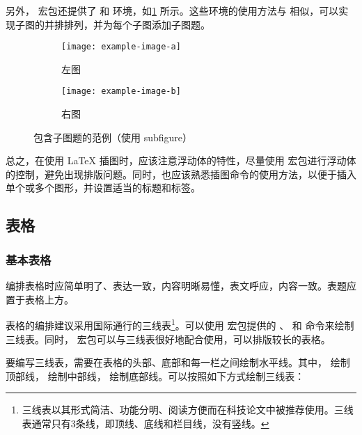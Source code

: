 另外， 宏包还提供了  和  环境，如\cref{fig:subfigure} 所示。这些环境的使用方法与  相似，可以实现子图的并排排列，并为每个子图添加子图题。

\begin{figure}[!htp]
    \centering
    \begin{subfigure}{0.3\textwidth}
        \centering
        \texttt{[image: example-image-a]}
        \caption{左图}
    \end{subfigure}
    \hspace{1cm}
    \begin{subfigure}{0.4\textwidth}
        \centering
        \texttt{[image: example-image-b]}
        \caption{右图}
    \end{subfigure}
    \caption{包含子图题的范例（使用 subfigure）}
    \label{fig:subfigure}
\end{figure}

总之，在使用 \LaTeX{} 插图时，应该注意浮动体的特性，尽量使用  宏包进行浮动体的控制，避免出现排版问题。同时，也应该熟悉插图命令的使用方法，以便于插入单个或多个图形，并设置适当的标题和标签。

\subsection{表格}

\subsubsection{基本表格}

编排表格时应简单明了、表达一致，内容明晰易懂，表文呼应，内容一致。表题应置于表格上方。

表格的编排建议采用国际通行的三线表\footnote{三线表以其形式简洁、功能分明、阅读方便而在科技论文中被推荐使用。三线表通常只有3条线，即顶线、底线和栏目线，没有竖线。}。可以使用  宏包提供的 、 和  命令来绘制三线表。同时， 宏包可以与三线表很好地配合使用，可以排版较长的表格。

要编写三线表，需要在表格的头部、底部和每一栏之间绘制水平线。其中， 绘制顶部线， 绘制中部线， 绘制底部线。可以按照如下方式绘制三线表：

